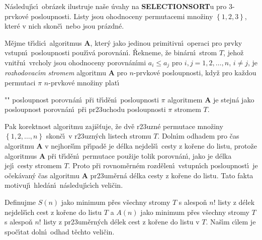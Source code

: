 \flushpar N\'asleduj\'\i c\'\i\ obr\'azek ilustruje na\v se \'uvahy na 
{\bf SELECTIONSORT}u pro $3$-prvkov\'e posloupnosti. Listy jsou 
ohodnoceny permutacemi mno\v ziny $\left\{1,2,3\right\}$, kter\'e v nich 
skon\v c\'\i\ nebo jsou pr\'azdn\'e. 
\midinsert
\centerline{}
\endcaption
\endinsert
\newpage

M\v ejme t\v r\'\i dic\'\i\ algoritmus {\bf A}, kter\'y 
jako jedinou pri\-mitivn\'\i\ operaci pro prvky vstupn\'\i\ 
posloupnosti pou\v z\'\i v\'a porov\-n\'an\'\i . \v Rekneme, \v ze 
bin\'arn\'\i\ strom $T$, jeho\v z vnit\v rn\'\i\ vrcholy jsou ohodnoceny 
porovn\'an\'\i mi  $a_i\le a_j$ pro $i,j=1,2,\dots,n$, $i\ne j$, je 
\emph{rozhodovac\'\i m} \emph{stromem} algoritmu {\bf A} pro 
$n$-prvkov\'e posloupnosti, kdy\v z pro ka\v zdou permutaci $\pi$
$n$-prvkov\'e mno\v ziny plat\'\i\ 
\roster
\item"{}"
posloupnost porovn\'an\'\i\ p\v ri t\v r\'\i d\v en\'\i\ posloupnosti $
\pi$ 
algoritmem {\bf A} je stejn\'a jako posloupnost porovn\'an\'\i\ p\v ri 
pr\accent23uchodu posloupnosti $\pi$ stromem $T$.
\endroster
\enddefinition
\medskip

\flushpar Pak korektnost algoritmu zaji\v s\v tuje, \v ze dv\v e r\accent23uzn\'e 
permutace mno\v ziny $\left\{1,2,\dots,n\right\}$ skon\v c\'\i\ v 
r\accent23uzn\'ych listech stromu $T$. Dol\-n\'\i m odhadem pro 
\v cas algoritmu {\bf A} v nej\-hor\v s\'\i m p\v r\'\i pad\v e je d\'elka nejdel\v s\'\i\ 
cesty z ko\v rene do listu, proto\v ze algoritmus {\bf A} p\v ri 
t\v r\'\i d\v en\'\i\ permutace pou\v zije tolik porovn\'an\'\i , jako je d\'elka 
jej\'\i\ cesty stromem $T$. Proto p\v ri rovnom\v ern\'em 
rozd\v elen\'\i\ vstupn\'\i ch po\-sloupnost\'\i\ je o\v cek\'avan\'y \v cas 
algoritmu {\bf A} pr\accent23um\v ern\'a d\'elka cesty z ko\v rene do 
listu. Tato fakta motivuj\'\i\ hled\'an\'\i\ n\'asleduj\'\i c\'\i ch veli\-\v cin. 
\medskip

\flushpar Definujme\newline 
$S\left(n\right)$ jako minimum p\v res v\v sechny stromy $T$ s alespo\v n $n
!$ listy z 
d\'elek nejdel\v s\'\i ch cest z ko\v rene 
do listu $T$ a\newline 
$A\left(n\right)$ jako minimum p\v res v\v sechny stromy $T$ s alespo\v n $n
!$ listy z
pr\accent23um\v ern\'ych d\'elek cest z ko\v rene do listu v $T$.\newline 
Na\v s\'\i m c\'\i lem je spo\v c\'\i tat doln\'\i\ odhad t\v echto veli\v cin.
\medskip

